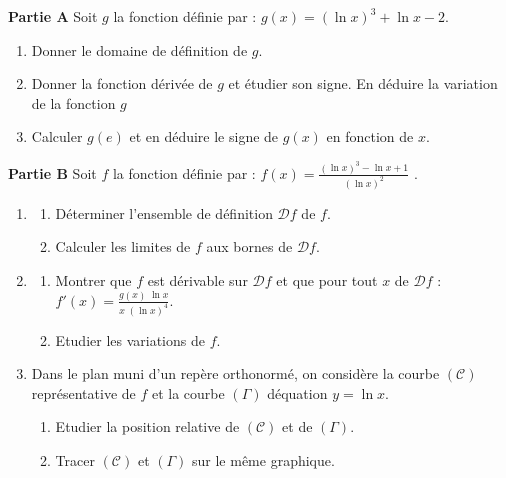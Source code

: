 \begin{exo}
\textbf{Partie A}
Soit $g$ la fonction d\'efinie par : $g(x) = (\ln x)^3 + \ln x - 2$.
\begin{enumerate}
\item Donner le domaine de d\'efinition de $g$.
\item Donner la fonction d\'eriv\'ee de $g$ et \'etudier son signe.
      En d\'eduire la variation de la fonction $g$
\item Calculer $g(e)$ et en d\'eduire le signe de $g(x)$ en fonction de $x$.
\end{enumerate}
\textbf{Partie B}
Soit $f$ la fonction d\'efinie par : $ f(x) = \frac{(\ln x)^3 - \ln x + 1}{(\ln x)^2}$ .
\begin{enumerate}
\item 
      \begin{enumerate}
      \item D\'eterminer l'ensemble de d\'efinition $\mathcal{D}f$ de $f$. 
      \item Calculer les limites de $f$ aux bornes de $\mathcal{D}f$.
      \end{enumerate}
\item 
      \begin{enumerate}
      \item Montrer que $f$ est d\'erivable sur $\mathcal{D}f$ et que pour tout $x$ de $\mathcal{D}f$ : 
            $f'(x) = \frac{g(x) \; \ln x}{x \; (\ln x)^4}$.
      \item Etudier les variations de $f$.
      \end{enumerate}
\item Dans le plan muni d'un rep\`ere orthonorm\'e,
      on consid\`ere la courbe $(\mathscr{C})$ repr\'esentative de $f$ et la courbe $(\Gamma)$ d\'equation $y = \ln x$.
      \begin{enumerate}
      \item Etudier la position relative de $(\mathscr{C})$ et de $(\Gamma)$.
      \item Tracer $(\mathscr{C})$ et $(\Gamma)$ sur le m\^eme graphique.
      \end{enumerate}
\end{enumerate}
\end{exo}
